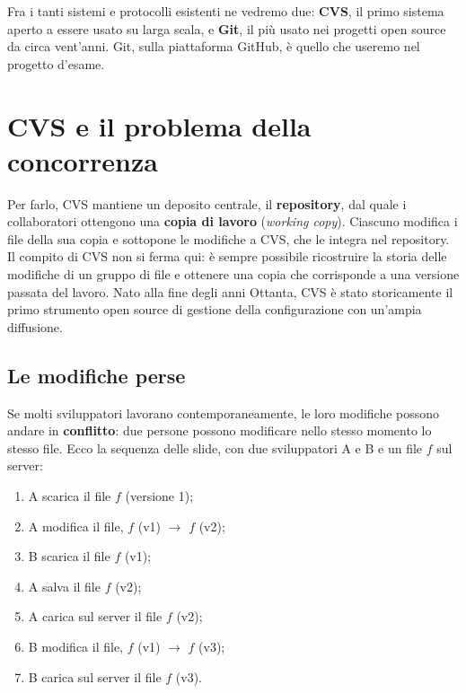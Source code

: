 Fra i tanti sistemi e protocolli esistenti ne vedremo due: \textbf{CVS}, il primo sistema aperto a essere usato su
larga scala, e \textbf{Git}, il più usato nei progetti open source da circa vent'anni. Git, sulla piattaforma GitHub,
è quello che useremo nel progetto d'esame.

\section{CVS e il problema della concorrenza}


Per farlo, CVS mantiene un deposito centrale, il \textbf{repository}, dal quale i collaboratori ottengono una
\textbf{copia di lavoro} (\textit{working copy}). Ciascuno modifica i file della sua copia e sottopone le modifiche a
CVS, che le integra nel repository. Il compito di CVS non si ferma qui: è sempre possibile ricostruire la storia delle
modifiche di un gruppo di file e ottenere una copia che corrisponde a una versione passata del lavoro. Nato alla fine
degli anni Ottanta, CVS è stato storicamente il primo strumento open source di gestione della configurazione con
un'ampia diffusione.

\subsection{Le modifiche perse}

Se molti sviluppatori lavorano contemporaneamente, le loro modifiche possono andare in \textbf{conflitto}: due persone
possono modificare nello stesso momento lo stesso file. Ecco la sequenza delle slide, con due sviluppatori A e B e un
file $f$ sul server:

\begin{enumerate}
  \item A scarica il file $f$ (versione 1);
  \item A modifica il file, $f$ (v1) $\to$ $f$ (v2);
  \item B scarica il file $f$ (v1);
  \item A salva il file $f$ (v2);
  \item A carica sul server il file $f$ (v2);
  \item B modifica il file, $f$ (v1) $\to$ $f$ (v3);
  \item B carica sul server il file $f$ (v3).
\end{enumerate}

